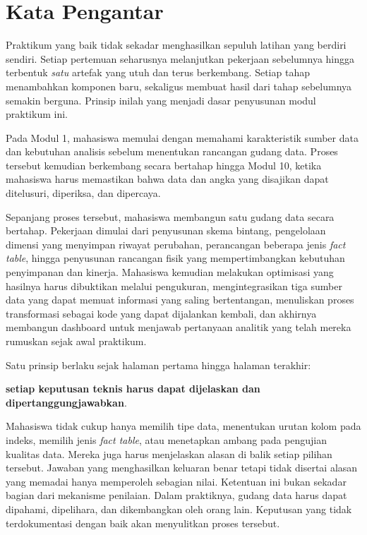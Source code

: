 \chapter*{Kata Pengantar}

Praktikum yang baik tidak sekadar menghasilkan sepuluh latihan yang berdiri sendiri. Setiap pertemuan seharusnya melanjutkan pekerjaan sebelumnya hingga terbentuk \emph{satu} artefak yang utuh dan terus berkembang. Setiap tahap menambahkan komponen baru, sekaligus membuat hasil dari tahap sebelumnya semakin berguna. Prinsip inilah yang menjadi dasar penyusunan modul praktikum ini.

Pada Modul 1, mahasiswa memulai dengan memahami karakteristik sumber data dan kebutuhan analisis sebelum menentukan rancangan gudang data. Proses tersebut kemudian berkembang secara bertahap hingga Modul 10, ketika mahasiswa harus memastikan bahwa data dan angka yang disajikan dapat ditelusuri, diperiksa, dan dipercaya.

Sepanjang proses tersebut, mahasiswa membangun satu gudang data secara bertahap. Pekerjaan dimulai dari penyusunan skema bintang, pengelolaan dimensi yang menyimpan riwayat perubahan, perancangan beberapa jenis \emph{fact table}, hingga penyusunan rancangan fisik yang mempertimbangkan kebutuhan penyimpanan dan kinerja. Mahasiswa kemudian melakukan optimisasi yang hasilnya harus dibuktikan melalui pengukuran, mengintegrasikan tiga sumber data yang dapat memuat informasi yang saling bertentangan, menuliskan proses transformasi sebagai kode yang dapat dijalankan kembali, dan akhirnya membangun dashboard untuk menjawab pertanyaan analitik yang telah mereka rumuskan sejak awal praktikum.

Satu prinsip berlaku sejak halaman pertama hingga halaman terakhir:

\textbf{setiap keputusan teknis harus dapat dijelaskan dan dipertanggungjawabkan}.

Mahasiswa tidak cukup hanya memilih tipe data, menentukan urutan kolom pada indeks, memilih jenis \emph{fact table}, atau menetapkan ambang pada pengujian kualitas data. Mereka juga harus menjelaskan alasan di balik setiap pilihan tersebut. Jawaban yang menghasilkan keluaran benar tetapi tidak disertai alasan yang memadai hanya memperoleh sebagian nilai. Ketentuan ini bukan sekadar bagian dari mekanisme penilaian. Dalam praktiknya, gudang data harus dapat dipahami, dipelihara, dan dikembangkan oleh orang lain. Keputusan yang tidak terdokumentasi dengan baik akan menyulitkan proses tersebut.

